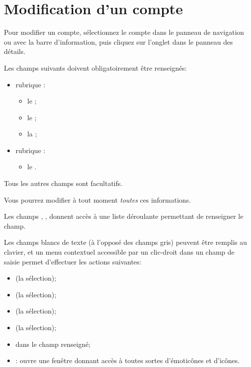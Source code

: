 \section{Modification d'un compte\label{accounts-modify} }

Pour modifier un compte, sélectionnez le compte dans le panneau de navigation ou avec la barre d'information, puis cliquez sur l'onglet  dans le panneau des détails.

Les champs suivants doivent obligatoirement être renseignés:
\begin{itemize}
	\item rubrique :
		\begin{itemize}
			\item le ;
			\item le ;
			\item la ;
		\end{itemize}
	\item rubrique :
		\begin{itemize}
			\item le .
		\end{itemize}
\end{itemize}
Tous les autres champs sont facultatifs. 


Vous pourrez modifier à tout moment \emph{toutes} ces informations.

Les champs , ,  donnent accès à une liste déroulante permettant de renseigner le champ.

Les champs blancs de texte (à l'opposé des champs gris) peuvent être remplis au clavier, et un menu contextuel accessible par un clic-droit dans un champ de saisie permet d'effectuer les actions suivantes:
\begin{itemize}
	 \item {} (la sélection);
	 \item {} (la sélection);
	 \item {} (la sélection);
	 \item {} (la sélection);
	 \item {} dans le champ renseigné;
	 \item {}: ouvre une fenêtre donnant accès à toutes sortes d'émoticônes et d'icônes.
\end{itemize}

